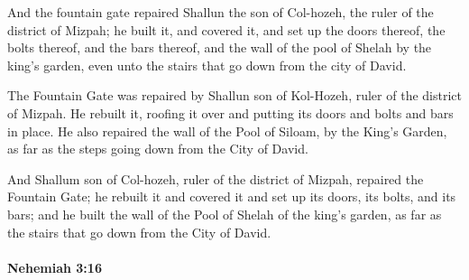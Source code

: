			\begin{versebox}
					\item[BHS] 
					\item[LXX] 
					\item[ASV] And the fountain gate repaired Shallun the son of Col-hozeh, the ruler of the district of Mizpah; he built it, and covered it, and set up the doors thereof, the bolts thereof, and the bars thereof, and the wall of the pool of Shelah by the king's garden, even unto the stairs that go down from the city of David.
					\item[NIV] The Fountain Gate was repaired by Shallun son of Kol-Hozeh, ruler of the district of Mizpah. He rebuilt it, roofing it over and putting its doors and bolts and bars in place. He also repaired the wall of the Pool of Siloam, by the King’s Garden, as far as the steps going down from the City of David.
					\item[NRSV] And Shallum son of Col-hozeh, ruler of the district of Mizpah, repaired the Fountain Gate; he rebuilt it and covered it and set up its doors, its bolts, and its bars; and he built the wall of the Pool of Shelah of the king’s garden, as far as the stairs that go down from the City of David.
			\end{versebox}

		\paragraph{Nehemiah 3:16} %
			\label{NEHEMIAH-3-16}


